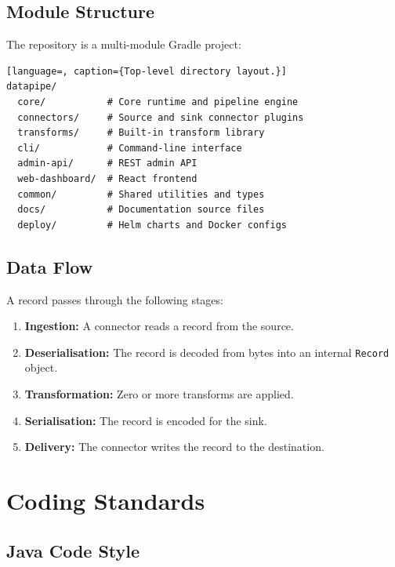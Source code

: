 \documentclass[
    language=english,
    doctype=manual,
    institution=none,
    titlestyle=book,
    oneside,
]{../../omnilatex}
\begin{document}
\section{Module Structure}

The repository is a multi-module Gradle project:

\begin{lstlisting}[language=, caption={Top-level directory layout.}]
datapipe/
  core/           # Core runtime and pipeline engine
  connectors/     # Source and sink connector plugins
  transforms/     # Built-in transform library
  cli/            # Command-line interface
  admin-api/      # REST admin API
  web-dashboard/  # React frontend
  common/         # Shared utilities and types
  docs/           # Documentation source files
  deploy/         # Helm charts and Docker configs
\end{lstlisting}

\section{Data Flow}

A record passes through the following stages:

\begin{enumerate}
    \item \textbf{Ingestion:} A connector reads a record from the source.
    \item \textbf{Deserialisation:} The record is decoded from bytes into
        an internal \texttt{Record} object.
    \item \textbf{Transformation:} Zero or more transforms are applied.
    \item \textbf{Serialisation:} The record is encoded for the sink.
    \item \textbf{Delivery:} The connector writes the record to the
        destination.
\end{enumerate}

\chapter{Coding Standards}
\label{sec:coding-standards}

\section{Java Code Style}
\end{document}
